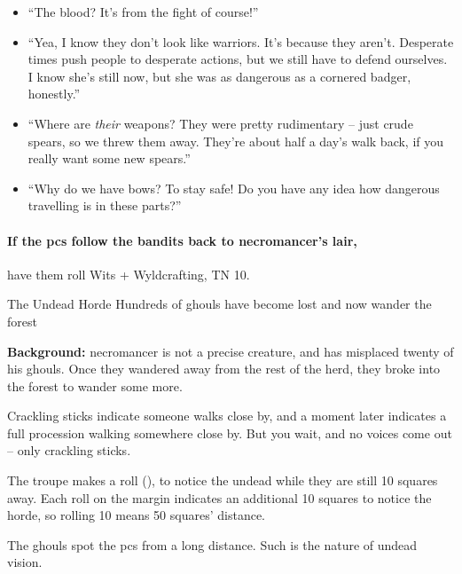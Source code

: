 \begin{itemize}
  \item
  ``The blood? It's from the fight of course!''
  \item
  ``Yea, I know they don't look like warriors.
  It's because they aren't.
  Desperate times push people to desperate actions, but we still have to defend ourselves.
  I know she's still now, but she was as dangerous as a cornered badger, honestly.''
  \item
  ``Where are \emph{their} weapons?
  They were pretty rudimentary -- just crude spears, so we threw them away.
  They're about half a day's walk back, if you really want some new spears.''
  \item
  ``Why do we have bows?
  To stay safe!
  Do you have any idea how dangerous travelling is in these parts?''
\end{itemize}

\banditking


\paragraph{If the \glspl{pc} follow the bandits back to \gls{necromancer}'s lair,}
have them roll Wits + Wyldcrafting, TN 10.

{The Undead Horde}%
{Hundreds of ghouls have become lost and now wander the forest}%

\textbf{Background:}
\Gls{necromancer} is not a precise creature, and has misplaced twenty of his ghouls.
Once they wandered away from the rest of the herd, they broke into the forest to wander some more.

\begin{boxtext}

  Crackling sticks indicate someone walks close by, and a moment later indicates a full procession walking somewhere close by.
  But you wait, and no voices come out -- only crackling sticks.

\end{boxtext}

The troupe makes a  roll (\tn[6]), to notice the undead while they are still 10 squares away.
Each roll on the margin indicates an additional 10 squares to notice the horde, so rolling 10 means 50 squares' distance.

The ghouls spot the \glspl{pc} from a long distance.
Such is the nature of undead vision.%


